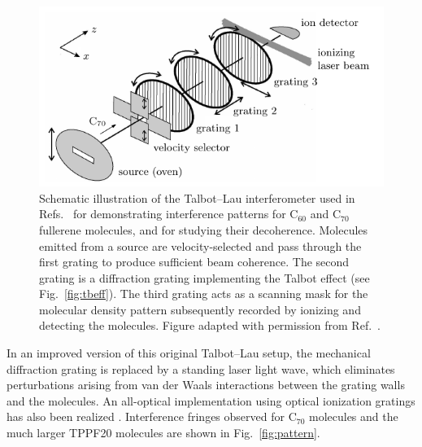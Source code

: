 \documentclass[3p,sort&compress]{elsarticle}
\begin{document}
\begin{figure}
\centering
\includegraphics[scale=0.75]{c70setup.pdf}
\caption{Schematic illustration of the Talbot--Lau interferometer used in Refs.~\cite{Arndt:1999:rc,Brezger:2002:mu,Hornberger:2003:tv,Hackermueller:2002:wb,Hackermuller:2004:rd} for demonstrating interference patterns for C$_{60}$ and C$_{70}$ fullerene molecules, and for studying their decoherence. Molecules emitted from a source are velocity-selected and pass through the first grating to produce sufficient beam coherence. The second grating is a diffraction grating implementing the Talbot effect (see Fig.~\ref{fig:tbeff}). The third grating acts as a scanning mask for the molecular density pattern subsequently recorded by ionizing and detecting the molecules.  Figure adapted with permission from Ref.~\cite{Brezger:2002:mu}.}
\label{fig:c70-setup}
\end{figure} 

In an improved version \cite{Gerlich:2007:om} of this original Talbot--Lau setup, the mechanical diffraction grating is replaced by a standing laser light wave, which eliminates perturbations arising from van der Waals interactions between the grating walls and the molecules. An all-optical implementation using optical ionization gratings has also been realized \cite{Haslinger:2013:ii}. Interference fringes observed for C$_{70}$ molecules and the much larger TPPF20 molecules \cite{Eibenberger:2013:az} are shown in Fig.~\ref{fig:pattern}.
 
\end{document}
